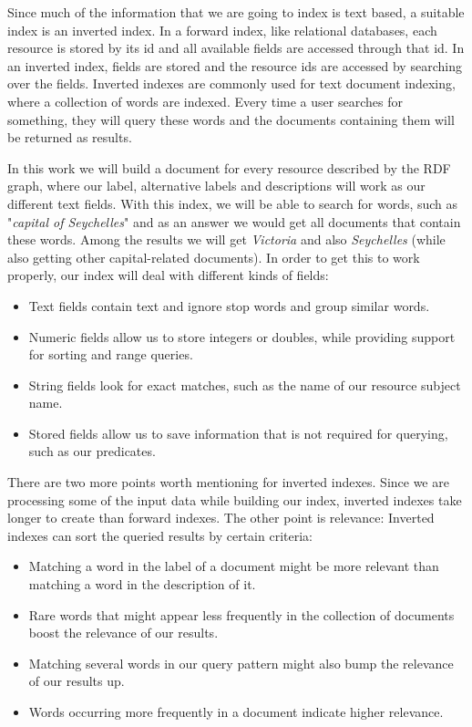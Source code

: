 Since much of the information that we are going to index is text based, a suitable index is an inverted index. In a forward index, like relational databases, each resource is stored by its id and all available fields are accessed through that id. In an inverted index, fields are stored and the resource ids are accessed by searching over the fields. Inverted indexes are commonly used for text document indexing, where a collection of words are indexed. Every time a user searches for something, they will query these words and the documents containing them will be returned as results.

In this work we will build a document for every resource described by the RDF graph, where our label, alternative labels and descriptions will work as our different text fields. With this index, we will be able to search for words, such as "\textit{capital of Seychelles}" and as an answer we would get all documents that contain these words. Among the results we will get \textit{Victoria} and also \textit{Seychelles} (while also getting other capital-related documents). In order to get this to work properly, our index will deal with different kinds of fields:

\begin{itemize}
    \item Text fields contain text and ignore stop words and group similar words.
    \item Numeric fields allow us to store integers or doubles, while providing support for sorting and range queries.
    \item String fields look for exact matches, such as the name of our resource subject name.
    \item Stored fields allow us to save information that is not required for querying, such as our predicates.
\end{itemize}

There are two more points worth mentioning for inverted indexes. Since we are processing some of the input data while building our index, inverted indexes take longer to create than forward indexes. The other point is relevance: Inverted indexes can sort the queried results by certain criteria: 

\begin{itemize}
    \item Matching a word in the label of a document might be more relevant than matching a word in the description of it.
    \item Rare words that might appear less frequently in the collection of documents boost the relevance of our results.
    \item Matching several words in our query pattern might also bump the relevance of our results up.
    \item Words occurring more frequently in a document indicate higher relevance.
\end{itemize}

